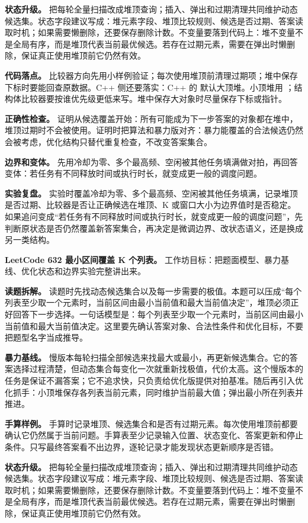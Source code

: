\textbf{状态升级。} 把每轮全量扫描改成堆顶查询；插入、弹出和过期清理共同维护动态候选集。状态字段建议写成：堆元素字段、堆顶比较规则、候选是否过期、答案读取时机；如果需要懒删除，还要保存删除计数。不变量要落到代码上：堆不变量不是全局有序，而是堆顶代表当前最优候选。若存在过期元素，需要在弹出时懒删除，保证真正使用堆顶前它仍然有效。

\textbf{代码落点。} 比较器方向先用小样例验证；每次使用堆顶前清理过期项；堆中保存下标时要能回查原数据。C++ 侧还要落实：C++ 的  默认大顶堆。小顶堆用 ；结构体比较器要按谁优先级更低来写。堆中保存大对象时尽量保存下标或指针。

\textbf{正确性检查。} 证明从候选覆盖开始：所有可能成为下一步答案的对象都在堆中，堆顶过期时不会被使用。证明时把算法和暴力版对齐：暴力能覆盖的合法候选仍然会被考虑，优化结构只替代重复检查，不改变答案集合。

\textbf{边界和变体。} 先用冷却为零、多个最高频、空闲被其他任务填满做对拍，再回答变体：若任务有不同释放时间或执行时长，就变成更一般的调度问题。

\textbf{实验复盘。} 实验时覆盖冷却为零、多个最高频、空闲被其他任务填满，记录堆顶是否过期、比较器是否让正确候选在堆顶、K 或窗口大小为边界值时是否稳定。如果追问变成“若任务有不同释放时间或执行时长，就变成更一般的调度问题”，先判断原状态是否仍然覆盖新答案集合，再决定是微调边界、改状态语义，还是换成另一类结构。

\noindent\textbf{LeetCode 632 最小区间覆盖 K 个列表。} 工作坊目标：把题面模型、暴力基线、优化状态和边界实验完整讲出来。

\textbf{读题拆解。} 读题时先找动态候选集合以及每一步需要的极值。本题可以压成“每个列表至少取一个元素时，当前区间由最小当前值和最大当前值决定”，堆顶必须正好回答下一步选择。一句话模型是：每个列表至少取一个元素时，当前区间由最小当前值和最大当前值决定。这里要先确认答案对象、合法性条件和优化目标，不要把题型名字当成推导。

\textbf{暴力基线。} 慢版本每轮扫描全部候选来找最大或最小，再更新候选集合。它的答案选择过程清楚，但动态集合每变化一次就重新找极值，代价太高。这个慢版本的任务是保证不漏答案；它不追求快，只负责给优化版提供对拍基准。随后再引入优化抓手：小顶堆保存各列表当前元素，同时维护当前最大值；弹出最小所在列表并推进。

\textbf{手算样例。} 手算时记录堆顶、候选集合和是否有过期元素。每次使用堆顶前都要确认它仍然属于当前问题。手算表至少记录输入位置、状态变化、答案更新和停止条件。只写最终答案看不出边界，逐轮记录才能发现状态更新顺序是否错。

\textbf{状态升级。} 把每轮全量扫描改成堆顶查询；插入、弹出和过期清理共同维护动态候选集。状态字段建议写成：堆元素字段、堆顶比较规则、候选是否过期、答案读取时机；如果需要懒删除，还要保存删除计数。不变量要落到代码上：堆不变量不是全局有序，而是堆顶代表当前最优候选。若存在过期元素，需要在弹出时懒删除，保证真正使用堆顶前它仍然有效。

